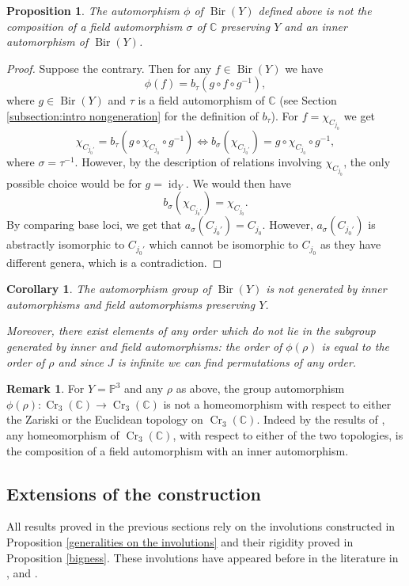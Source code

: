\documentclass[JEP,XML,SOM,Unicode,published]{cedram}
\theoremstyle{plain}
\newtheorem{corollary}[theorem]{Corollary}
\newtheorem{proposition}[theorem]{Proposition}
\theoremstyle{definition}
\newtheorem{remark}[theorem]{Remark}
\newcommand\Bir{\operatorname{Bir}}
\newcommand\Cr{\operatorname{Cr}}
\newcommand\id{\operatorname{id}}
\newcommand{\CC}{\mathbb{C}}
\newcommand{\PP}{\mathbb{P}}
\begin{document}
\begin{proposition}
The automorphism $\phi$ of $\Bir(Y)$ defined above is not the composition of a
field automorphism $\sigma$ of $\CC$ preserving $Y$ and an inner automorphism of $\Bir(Y)$.
\end{proposition}

\begin{proof}
Suppose the contrary. Then for any $f \in \Bir(Y)$ we have
\[
\phi(f) = b_{\tau}( g \circ f \circ g^{-1}),
\]
where $g \in \Bir(Y)$ and $\tau$ is a field automorphism of $\CC$ (see Section \ref{subsection:intro nongeneration} for the definition of $b_{\tau}$).
For $f = \chi_{C_{j_0}}$ we get
\[
\chi_{C_{{j_0}'}}
= b_{\tau} \left( g \circ \chi_{C_{j_0}} \circ g^{-1} \right)
\iff b_{\sigma}(\chi_{C_{{j_0}'}}) = g \circ \chi_{C_{j_0}} \circ g^{-1},
\]
where $\sigma = \tau^{-1}$.
However, by the description of relations involving $\chi_{C_{j_0}}$, the only possible choice would be for $g = \id_Y$.
We would then have
\[
b_{\sigma}(\chi_{C_{{j_0}'}}) = \chi_{C_{j_0}}.
\]
By comparing base loci, we get that $a_{\sigma}(C_{{j_0}'}) = C_{j_0}$. However, $a_{\sigma}(C_{{j_0}'})$ is abstractly isomorphic to $C_{{j_0}'}$ which cannot be isomorphic to $C_{j_0}$ as they have different genera, which is a contradiction.
\end{proof}

\begin{corollary}
The automorphism group of $\Bir(Y)$ is not generated by inner automorphisms and field automorphisms preserving $Y$.

Moreover, there exist elements of any order which do not lie in the subgroup generated by inner and field automorphisms: the order of $\phi(\rho)$ is equal to the order of $\rho$ and since $J$ is infinite we can find permutations of any order.
\end{corollary}

\begin{remark}
For $Y = \PP^3$ and any $\rho$ as above, the group automorphism $\phi(\rho) \colon \Cr_3(\CC) \to \Cr_3(\CC)$ is not a homeomorphism with respect to either the Zariski or the Euclidean topology on $\Cr_3(\CC)$.
Indeed by the results of \cite{ContinuousAutomorphisms}, any homeomorphism of $\Cr_3(\CC)$, with respect to either of the two topologies, is the composition of a field automorphism with an inner automorphism.
\end{remark}

\subsection{Extensions of the construction}
All results proved in the previous sections rely on the involutions constructed in Proposition \ref{generalities on the involutions} and their rigidity proved in Proposition \ref{bigness}. These involutions have appeared before in the literature in \cite{Cutrone-Marshburn}, \cite{WeakFanos} and \cite{WeakFanosCubics}.
\end{document}
